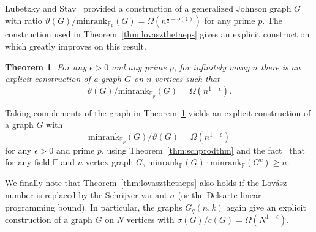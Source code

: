 \documentclass[11pt]{article}
\newtheorem{theorem}{Theorem}[section]
\theoremstyle{definition}
\theoremstyle{remark}
\begin{document}
Lubetzky and Stav~\cite{LubStav} provided a construction of a generalized Johnson graph $G$ with ratio $\vartheta(G)/\text{minrank}_{\mathbb{F}_p}(G) = \Omega(n^{\frac12 - o(1)})$ for any prime $p$. 
The construction used in Theorem~\ref{thm:lovaszthetaeps} gives an explicit construction which greatly improves on this result.

\begin{theorem}\label{thm:fixpcons}
For any $\epsilon > 0$ and any prime $p$, for infinitely many $n$ there is an explicit construction of a graph $G$ on $n$ vertices such that \[\vartheta(G)/\text{minrank}_{\mathbb{F}_p}(G) = \Omega(n^{1-\epsilon}).\]
\end{theorem}



Taking complements of the graph in Theorem~\ref{thm:fixpcons} yields an explicit construction of a graph $G$ with \[\text{minrank}_{\mathbb{F}_{p}}(G)/\vartheta(G) = \Omega(n^{1-\epsilon})\] for any $\epsilon > 0$ and prime $p$, using Theorem~\ref{thm:schprodthm} and the fact~\cite{Peeters} that for any field $\mathbb{F}$ and $n$-vertex graph $G$, $\text{minrank}_{\mathbb{F}}(G) \cdot \text{minrank}_{\mathbb{F}}(G^c)\ge n$.

We finally note that Theorem~\ref{thm:lovaszthetaeps} also holds if the Lov\'asz number is replaced by the Schrijver variant $\sigma$ (or the Delsarte linear programming bound). In particular, the graphs $G_q(n, k)$ again give an explicit construction of a graph $G$ on $N$ vertices with $\sigma(G)/c(G) = \Omega(N^{1-\epsilon})$. 







\end{document}
